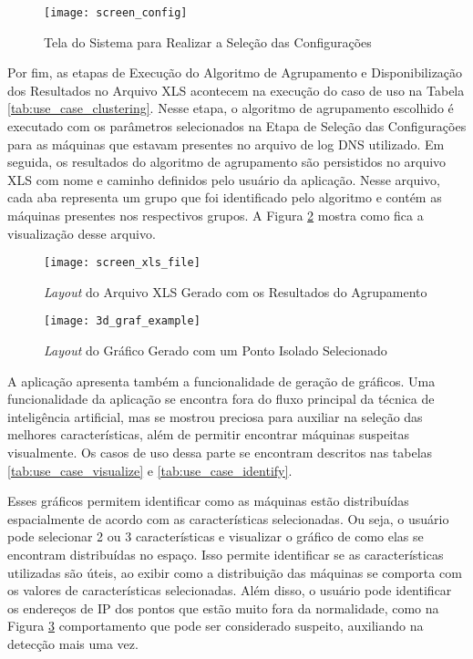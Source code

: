 \begin{figure}
\centering
\texttt{[image: screen\_config]}
\caption[Tela do Sistema para Realizar a Seleção das Configurações]{Tela do Sistema para Realizar a Seleção das Configurações} \label{fig:screen_config}
\end{figure}

Por fim, as etapas de Execução do Algoritmo de Agrupamento e Disponibilização dos Resultados no Arquivo XLS acontecem na execução do caso de uso na Tabela \ref{tab:use_case_clustering}. Nesse etapa, o algoritmo de agrupamento escolhido é executado com os parâmetros selecionados na Etapa de Seleção das Configurações para as máquinas que estavam presentes no arquivo de log DNS utilizado. Em seguida, os resultados do algoritmo de agrupamento são persistidos no arquivo XLS com nome e caminho definidos pelo usuário da aplicação. Nesse arquivo, cada aba representa um grupo que foi identificado pelo algoritmo e contém as máquinas presentes nos respectivos grupos. A Figura \ref{fig:screen_xls_file} mostra como fica a visualização desse arquivo.

\begin{figure}
\centering
\texttt{[image: screen\_xls\_file]}
\caption[\textit{Layout} do Arquivo XLS Gerado com os Resultados do Agrupamento]{\textit{Layout} do Arquivo XLS Gerado com os Resultados do Agrupamento} \label{fig:screen_xls_file}
\end{figure}

\begin{figure}
\centering
\texttt{[image: 3d\_graf\_example]}
\caption[\textit{Layout}  do Gráfico Gerado com um Ponto Isolado Selecionado]{\textit{Layout}  do Gráfico Gerado com um Ponto Isolado Selecionado} \label{fig:3d_graf_example}
\end{figure}

A aplicação apresenta também a funcionalidade de geração de gráficos. Uma funcionalidade da aplicação se encontra fora do fluxo principal da técnica de inteligência artificial, mas se mostrou preciosa para auxiliar na seleção das melhores características, além de permitir encontrar máquinas suspeitas visualmente. Os casos de uso dessa parte se encontram descritos nas tabelas \ref{tab:use_case_visualize} e \ref{tab:use_case_identify}.

Esses gráficos permitem identificar como as máquinas estão distribuídas espacialmente de acordo com as características selecionadas. Ou seja, o usuário pode selecionar 2 ou 3 características e visualizar o gráfico de como elas se encontram distribuídas no espaço. Isso permite identificar se as características utilizadas são úteis, ao exibir como a distribuição das máquinas se comporta com os valores de características selecionadas. Além disso, o usuário pode identificar os endereços de IP dos pontos que estão muito fora da normalidade, como na Figura \ref{fig:3d_graf_example} comportamento que pode ser considerado suspeito, auxiliando na detecção mais uma vez.
